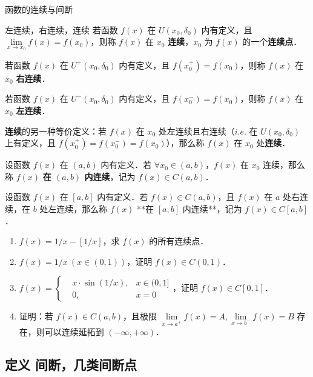 

函数的连续与间断

\begin{definition}{左连续，右连续，连续}
  若函数 $f(x)$ 在 $U(x_0,\delta_0)$ 内有定义，且 $\lim\limits_{x\rightarrow x_0}f(x)=f(x_0)$，则称 $f(x)$ 在 $x_0$ \textbf{连续}，$x_0$ 为 $f(x)$ 的一个\textbf{连续点}．

  若函数 $f(x)$ 在 $U^+(x_0,\delta_0)$ 内有定义，且 $f(x_0^+)=f(x_0)$，则称 $f(x)$ 在 $x_0$ \textbf{右连续}．

  若函数 $f(x)$ 在 $U^-(x_0,\delta_0)$ 内有定义，且 $f(x_0^-)=f(x_0)$，则称 $f(x)$ 在 $x_0$ \textbf{左连续}．
\end{definition}

  \textbf{连续}的另一种等价定义：若 $f(x)$ 在 $x_0$ 处左连续且右连续（$i.e. $ 在 $U(x_0,\delta_0)$ 上有定义，且 $f(x_0^+)=f(x_0^-)=f(x_0)$），那么称 $f(x)$ 在 $x_0$ 处\textbf{连续}．

  设函数 $f(x)$ 在 $(a,b)$ 内有定义．若 $\forall x_0\in(a,b)$，$f(x)$ 在 $x_0$ 连续，那么称 $f(x)$ \textbf{在 $(a,b)$ 内连续}，记为 $f(x)\in C(a,b)$．

  设函数 $f(x)$ 在 $[a,b]$ 内有定义．若 $f(x)\in C(a,b)$，且 $f(x)$ 在 $a$ 处右连续，在 $b$ 处左连续，那么称 $f(x)$ **在 $[a,b]$ 内连续**，记为 $f(x)\in C[a,b]$．

\begin{exercise}{}
\begin{enumerate}
\item $f(x)=1/x-[1/x]$，求 $f(x)$ 的所有连续点．
\item $f(x)=1/x\ (x\in(0,1))$，证明 $f(x)\in C(0,1)$．
\item $f(x)=\left\{\begin{aligned}&x\cdot \sin(1/x),&x\in(0,1]\\&0,&x=0 \end{aligned}\right.$，证明 $f(x)\in C[0,1]$．
\item 证明：若 $f(x)\in C(a,b)$，且极限 $\lim\limits_{x\rightarrow a^+}f(x)=A,\lim\limits_{x\rightarrow b^-}f(x)=B$ 存在，则可以连续延拓到 $(-\infty,+\infty)$．
\end{enumerate}
\end{exercise}

\subsection{定义  间断，几类间断点}

